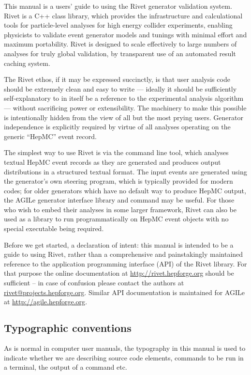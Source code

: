 This manual is a users' guide to using the Rivet generator validation
system. Rivet is a C++ class library, which provides the infrastructure and
calculational tools for particle-level analyses for high energy collider
experiments, enabling physicists to
validate event generator models and tunings with minimal effort and maximum
portability. Rivet is designed to scale effectively to large numbers of analyses
for truly global validation, by transparent use of an automated result caching
system.

The Rivet ethos, if it may be expressed succinctly, is that user analysis code
should be extremely clean and easy to write --- ideally it should be
sufficiently self-explanatory to in itself be a reference to the experimental
analysis algorithm --- without sacrificing power or extensibility. The machinery
to make this possible is intentionally hidden from the view of all but the most
prying users. Generator independence is explicitly required by virtue of all
analyses operating on the generic ``HepMC'' event record.

The simplest way to use Rivet is via the  command line tool, which
analyses textual HepMC event records as they are generated and produces output
distributions in a structured textual format. The input events are generated
using the generator's own steering program, which is typically provided for
modern codes; for older generators which have no default way to produce HepMC
output, the AGILe generator interface library and  command may
be useful. For those who wish to embed their analyses in some larger framework,
Rivet can also be used as a library to run programmatically on HepMC event
objects with no special executable being required.

Before we get started, a declaration of intent: this manual is intended to be a
guide to using Rivet, rather than a comprehensive and painstakingly maintained
reference to the application programming interface (API) of the Rivet
library. For that purpose the online documentation at
\url{http://rivet.hepforge.org} should be sufficient -- in case of confusion
please contact the authors at \url{rivet@projects.hepforge.org}. Similar API
documentation is maintained for AGILe at \url{http://agile.hepforge.org}.


\subsection{Typographic conventions}
As is normal in computer user manuals, the typography in this manual is used to
indicate whether we are describing source code elements, commands to be run in a
terminal, the output of a command etc.

